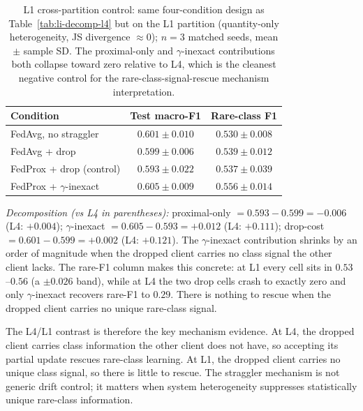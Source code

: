 \documentclass[11pt,a4paper]{report}
\begin{document}
\begin{table}[H]
\centering
\caption{L1 cross-partition control: same four-condition design as
Table~\ref{tab:li-decomp-l4} but on the L1 partition (quantity-only
heterogeneity, JS divergence $\approx 0$); $n=3$ matched seeds, mean
$\pm$ sample SD. The proximal-only and $\gamma$-inexact contributions both
collapse toward zero relative to L4, which is the cleanest negative
control for the rare-class-signal-rescue mechanism interpretation.}
\label{tab:li-decomp-l1}
\small
\begin{tabular}{lcc}
\toprule
Condition                                       & Test macro-F1        & Rare-class F1 \\
\midrule
FedAvg, no straggler                            & $0.601 \pm 0.010$    & $0.530 \pm 0.008$ \\
FedAvg + drop                                   & $0.599 \pm 0.006$    & $0.539 \pm 0.012$ \\
FedProx + drop (control)                        & $0.593 \pm 0.022$    & $0.537 \pm 0.039$ \\
FedProx + $\gamma$-inexact                      & $0.605 \pm 0.009$    & $0.556 \pm 0.014$ \\
\bottomrule
\end{tabular}

\smallskip
\noindent\textit{Decomposition (vs L4 in parentheses):}
proximal-only $= 0.593 - 0.599 = -0.006$ (L4: $+0.004$);
$\gamma$-inexact $= 0.605 - 0.593 = +0.012$ (L4: $+0.111$);
drop-cost $= 0.601 - 0.599 = +0.002$ (L4: $+0.121$). The $\gamma$-inexact
contribution shrinks by an order of magnitude when the dropped client
carries no class signal the other client lacks. The rare-F1 column makes
this concrete: at L1 every cell sits in $0.53$--$0.56$ (a $\pm 0.026$
band), while at L4 the two drop cells crash to exactly zero and only
$\gamma$-inexact recovers rare-F1 to $0.29$. There is nothing to rescue
when the dropped client carries no unique rare-class signal.
\end{table}

The L4/L1 contrast is therefore the key mechanism evidence. At L4, the
dropped client carries class information the other client does not have, so
accepting its partial update rescues rare-class learning. At L1, the dropped
client carries no unique class signal, so there is little to rescue. The
straggler mechanism is not generic drift control; it matters when system
heterogeneity suppresses statistically unique rare-class information.
\end{document}
